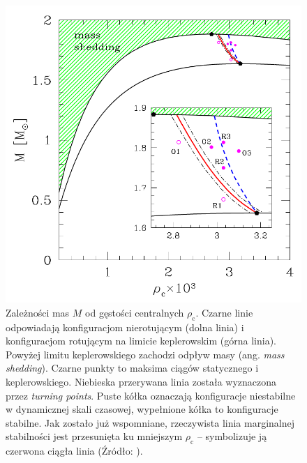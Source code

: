 \documentclass{bachelor_thesis}
\begin{document}
        \begin{figure}[h!]
            \centering
            \includegraphics[scale=.3]{figures/RysTak.png}
            \caption{Zależności mas $M$ od gęstości centralnych $\rho_\textrm{c}$. Czarne linie odpowiadają konfiguracjom nierotującym (dolna linia) i konfiguracjom rotującym na limicie keplerowskim (górna linia). Powyżej limitu keplerowskiego zachodzi odpływ masy (ang. \textit{mass shedding}). Czarne punkty to maksima ciągów statycznego i keplerowskiego. Niebieska przerywana linia została wyznaczona przez \textit{turning points}. Puste kółka oznaczają konfiguracje niestabilne w dynamicznej skali czasowej, wypełnione kółka to konfiguracje stabilne. Jak zostało już wspomniane, rzeczywista linia marginalnej stabilności jest przesunięta ku mniejszym $\rho_\textrm{c}$ -- symbolizuje ją czerwona ciągła linia (Źródło: \citealp{Takami2011}).}
            \label{RysTak}
        \end{figure}
\end{document}
